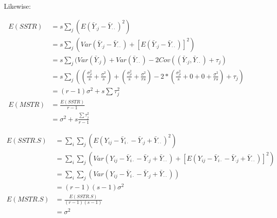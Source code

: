 \documentclass{article}\usepackage[]{graphicx}\usepackage[]{color}
\begin{document}
Likewise:

\begin{displaymath}
\begin{split}
E(SSTR) &= s \sum_j (E(\bar{Y}_{\cdot j}-\bar{Y}_{\cdot\cdot})^2) \\
       &= s \sum_j (Var(\bar{Y}_{\cdot j}-\bar{Y}_{\cdot\cdot})+ [E(\bar{Y}_{\cdot j}-\bar{Y}_{\cdot\cdot})]^2)\\ 
       &= s \sum_j (Var(\bar{Y}_{\cdot j}) + Var(\bar{Y}_{\cdot\cdot}) - 2 Cov((\bar{Y}_{\cdot j}, \bar{Y}_{\cdot\cdot}) + \tau_j)\\
       &= s \sum_j ( (\frac{\sigma_\rho^2}{s}+ \frac{\sigma^2}{s}) + (\frac{\sigma_\rho^2}{s}+ \frac{\sigma^2}{rs}) -2*(\frac{\sigma_\rho^2}{s} + 0+ 0 + \frac{\sigma^2}{rs}) + \tau_j)\\
       &= (r-1)\sigma^2 + s\sum \tau_j^2\\
E(MSTR) &= \frac{E(SSTR)}{r-1}\\
       &= \sigma^2 + s\frac{\sum \tau_j^2}{r-1}
\end{split}
\end{displaymath}

\begin{displaymath}
\begin{split}
E(SSTR.S) &= \sum_i \sum_j (E(Y_{ij}-\bar{Y}_{i\cdot}-\bar{Y}_{\cdot j}+\bar{Y}_{\cdot\cdot})^2) \\
       &= \sum_i \sum_j (Var(Y_{ij}-\bar{Y}_{i\cdot}-\bar{Y}_{\cdot j}+\bar{Y}_{\cdot\cdot})+ [E(Y_{ij}-\bar{Y}_{i\cdot}-\bar{Y}_{\cdot j}+\bar{Y}_{\cdot\cdot})]^2)\\ 
       &= \sum_i \sum_j (Var(Y_{ij}-\bar{Y}_{i\cdot}-\bar{Y}_{\cdot j}+\bar{Y}_{\cdot\cdot}))\\
       &= (r-1)(s-1)\sigma^2\\
E(MSTR.S) &= \frac{E(SSTR.S)}{(r-1)(s-1)}\\
       &= \sigma^2
\end{split}
\end{displaymath}
\end{document}
